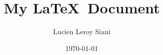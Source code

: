 \begin{titlepage}
    \pagestyle{empty}
    \centering

    \vspace{0.5cm}
    \title{My \LaTeX\ Document}
    \author{Lucien Leroy Siani}
    \date{\today}
\end{titlepage}